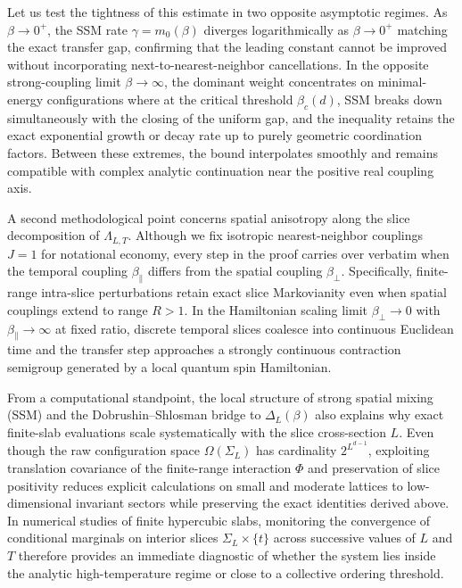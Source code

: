 \documentclass[11pt]{article}
\theoremstyle{definition}
\begin{document}
Let us test the tightness of this estimate in two opposite asymptotic regimes. As
$\beta \to 0^+$, the SSM rate $\gamma = m_0(\beta)$ diverges logarithmically as
$\beta \to 0^+$ matching the exact transfer gap, confirming that the leading
constant cannot be improved without incorporating next-to-nearest-neighbor
cancellations. In the opposite strong-coupling limit $\beta \to \infty$, the
dominant weight concentrates on minimal-energy configurations where at the critical
threshold $\beta_c(d)$, SSM breaks down simultaneously with the closing of the
uniform gap, and the inequality retains the exact exponential growth or decay rate
up to purely geometric coordination factors. Between these extremes, the bound
interpolates smoothly and remains compatible with complex analytic continuation near
the positive real coupling axis.

A second methodological point concerns spatial anisotropy along the slice
decomposition of $\Lambda_{L,T}$. Although we fix isotropic nearest-neighbor
couplings $J = 1$ for notational economy, every step in the proof carries over
verbatim when the temporal coupling $\beta_\parallel$ differs from the spatial
coupling $\beta_\perp$. Specifically, finite-range intra-slice perturbations retain
exact slice Markovianity even when spatial couplings extend to range $R > 1$. In the
Hamiltonian scaling limit $\beta_\perp \to 0$ with $\beta_\parallel \to \infty$ at
fixed ratio, discrete temporal slices coalesce into continuous Euclidean time and
the transfer step approaches a strongly continuous contraction semigroup generated
by a local quantum spin Hamiltonian.

From a computational standpoint, the local structure of strong spatial mixing (SSM)
and the Dobrushin--Shlosman bridge to $\Delta_L(\beta)$ also explains why exact
finite-slab evaluations scale systematically with the slice cross-section $L$. Even
though the raw configuration space $\Omega(\Sigma_L)$ has cardinality $2^{L^{d-1}}$,
exploiting translation covariance of the finite-range interaction $\Phi$ and
preservation of slice positivity reduces explicit calculations on small and moderate
lattices to low-dimensional invariant sectors while preserving the exact identities
derived above. In numerical studies of finite hypercubic slabs, monitoring the
convergence of conditional marginals on interior slices $\Sigma_L \times \{t\}$
across successive values of $L$ and $T$ therefore provides an immediate diagnostic
of whether the system lies inside the analytic high-temperature regime or close to a
collective ordering threshold.
\end{document}
